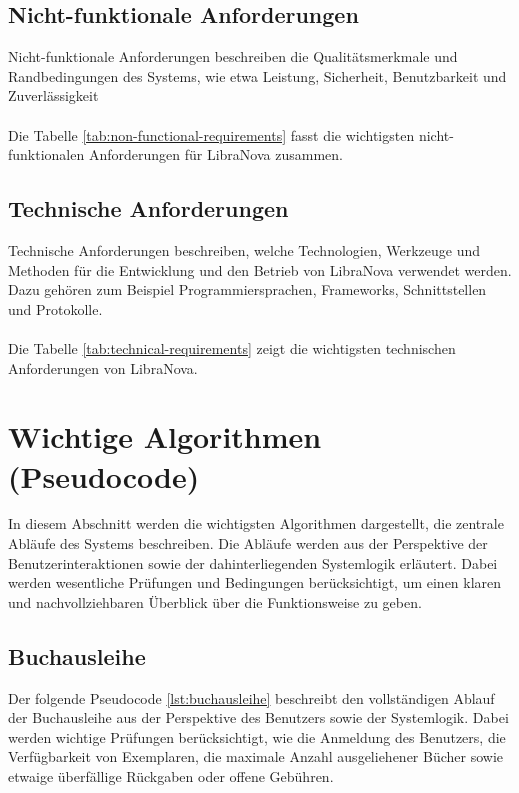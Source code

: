 \subsection{Nicht-funktionale Anforderungen}

Nicht-funktionale Anforderungen beschreiben die Qualitätsmerkmale und Randbedingungen des Systems, wie etwa Leistung, Sicherheit, Benutzbarkeit und Zuverlässigkeit\\ \\
Die  Tabelle \ref{tab:non-functional-requirements} fasst die wichtigsten nicht-funktionalen Anforderungen für LibraNova zusammen.

\subsection{Technische  Anforderungen}

Technische Anforderungen beschreiben, welche Technologien, Werkzeuge und Methoden für die Entwicklung und den Betrieb von LibraNova verwendet werden. Dazu gehören zum Beispiel Programmiersprachen, Frameworks, Schnittstellen und Protokolle.\\ \\
Die Tabelle \ref{tab:technical-requirements} zeigt die wichtigsten technischen Anforderungen von LibraNova.


\section{Wichtige Algorithmen (Pseudocode)}

In diesem Abschnitt werden die wichtigsten Algorithmen dargestellt, die zentrale Abläufe des Systems beschreiben. Die Abläufe werden aus der Perspektive der Benutzerinteraktionen sowie der dahinterliegenden Systemlogik erläutert. Dabei werden wesentliche Prüfungen und Bedingungen berücksichtigt, um einen klaren und nachvollziehbaren Überblick über die Funktionsweise zu geben.

\subsection{Buchausleihe}

Der folgende Pseudocode \ref{lst:buchausleihe} beschreibt den vollständigen Ablauf der Buchausleihe aus der Perspektive des Benutzers sowie der Systemlogik. Dabei werden wichtige Prüfungen berücksichtigt, wie die Anmeldung des Benutzers, die Verfügbarkeit von Exemplaren, die maximale Anzahl ausgeliehener Bücher sowie etwaige überfällige Rückgaben oder offene Gebühren.

